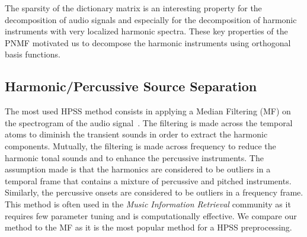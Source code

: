The sparsity of the dictionary matrix is an interesting property for the decomposition of audio signals and especially for the decomposition of harmonic instruments with very localized harmonic spectra. These key properties of the PNMF motivated us to decompose the harmonic instruments using orthogonal basis functions.




\subsection{Harmonic/Percussive Source Separation}


The most used HPSS method consists in applying a Median Filtering (MF) on the spectrogram of the audio signal~\cite{fitzgerald2010harmonic}. The filtering is made across the temporal atoms to diminish the transient sounds in order to extract the harmonic components. Mutually, the filtering is made across frequency to reduce the harmonic tonal sounds and to enhance the percussive instruments. The assumption made is that the harmonics are considered to be outliers in a temporal frame that contains a mixture of percussive and pitched instruments. Similarly, the percussive onsets are considered to be outliers in a frequency frame. This method is often used in the \emph{Music Information Retrieval} community as it requires few parameter tuning and is computationally effective. We compare our method to the MF as it is the most popular method for a HPSS preprocessing.

